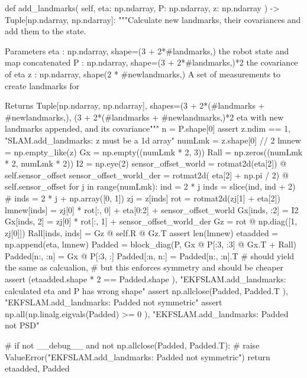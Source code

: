 \begin{pythoncode}
def add_landmarks(
    self, eta: np.ndarray, P: np.ndarray, z: np.ndarray
) -> Tuple[np.ndarray, np.ndarray]:
    """Calculate new landmarks, their covariances and add them to the state.

    Parameters
    eta : np.ndarray, shape=(3 + 2*#landmarks,)
    the robot state and map concatenated
    P : np.ndarray, shape=(3 + 2*#landmarks,)*2
    the covariance of eta
    z : np.ndarray, shape(2 * #newlandmarks,)
    A set of measurements to create landmarks for

    Returns
    Tuple[np.ndarray, np.ndarray], 
    shapes=(3 + 2*(#landmarks + #newlandmarks,), 
    (3 + 2*(#landmarks + #newlandmarks,)*2
    eta with new landmarks appended, and its covariance"""
    n = P.shape[0]
    assert z.ndim == 1, "SLAM.add_landmarks: z must be a 1d array"
    numLmk = z.shape[0] // 2
    lmnew = np.empty_like(z)
    Gx = np.empty((numLmk * 2, 3))
    Rall = np.zeros((numLmk * 2, numLmk * 2))
    I2 = np.eye(2)
    sensor_offset_world = rotmat2d(eta[2]) @ self.sensor_offset
    sensor_offset_world_der = rotmat2d(
        eta[2] + np.pi / 2) @ self.sensor_offset
    for j in range(numLmk):
        ind = 2 * j
        inds = slice(ind, ind + 2)
        # inds = 2 * j + np.array([0, 1])
        zj = z[inds]
        rot = rotmat2d(zj[1] + eta[2])
        lmnew[inds] = zj[0] * rot[:, 0] + eta[0:2] + sensor_offset_world
        Gx[inds, :2] = I2
        Gx[inds, 2] = zj[0] * rot[:, 1] + sensor_offset_world_der
        Gz = rot @ np.diag([1, zj[0]])
        Rall[inds, inds] = Gz @ self.R @ Gz.T
    assert len(lmnew) %
    etaadded = np.append(eta, lmnew)
    Padded = block_diag(P, Gx @ P[:3, :3] @ Gx.T + Rall)
    Padded[n:, :n] = Gx @ P[:3, :]
    Padded[:n, n:] = Padded[n:, :n].T  # should yield the same as calcualion, 
         # but this enforces symmetry and should be cheaper
    assert (etaadded.shape * 2 == Padded.shape
        ), "EKFSLAM.add_landmarks: calculated eta and P has wrong shape"
    assert np.allclose(Padded, Padded.T
        ), "EKFSLAM.add_landmarks: Padded not symmetric"
    assert np.all(np.linalg.eigvals(Padded) >= 0
        ), "EKFSLAM.add_landmarks: Padded not PSD"

    # if not __debug__ and not np.allclose(Padded, Padded.T):
    #     raise ValueError("EKFSLAM.add_landmarks: Padded not symmetric")
    return etaadded, Padded
\end{pythoncode}